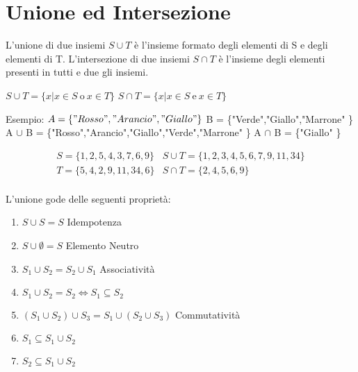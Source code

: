 \section{Unione ed Intersezione}
L'unione di due insiemi $S \cup T$ è l'insieme formato degli elementi di S e degli
elementi di T.\newline
L'intersezione di due insiemi $S \cap T$ è l'insieme degli elementi presenti in
tutti e due gli insiemi.

$S \cup T = \{x | x \in S \ \text{o} \ x \in T \} $ \newline
$S \cap T = \{x | x \in S \ \text{e} \ x \in T \} $

Esempio:\newline
$A = \{"Rosso","Arancio","Giallo" \}$ \newline
B = \{"Verde","Giallo","Marrone" \} \newline
A $\cup$ B = \{"Rosso","Arancio","Giallo","Verde","Marrone" \}\newline
A $\cap$ B = \{"Giallo" \}

\begin{align*}
S = \{1,2,5,4,3,7,6,9\}  & S \cup T = \{1,2,3,4,5,6,7,9,11,34\} \\
T = \{5,4,2,9,11,34,6\}  & S \cap T = \{2,4,5,6,9\} \\
\end{align*}

L'unione gode delle seguenti proprietà:
\begin{prop}
\begin{enumerate}
\item $S \cup S = S$ \quad Idempotenza
\item $S \cup \emptyset = S$ \quad Elemento Neutro
\item $S_1 \cup S_2 = S_2 \cup S_1$ \quad Associatività
\item $S_1 \cup S_2 = S_2 \iff S_1 \subseteq S_2$
\item $(S_1 \cup S_2) \cup S_3 = S_1 \cup (S_2 \cup S_3)$ \quad Commutatività
\item $S_1 \subseteq S_1 \cup S_2$
\item $S_2 \subseteq S_1 \cup S_2$
\end{enumerate}
\end{prop}

